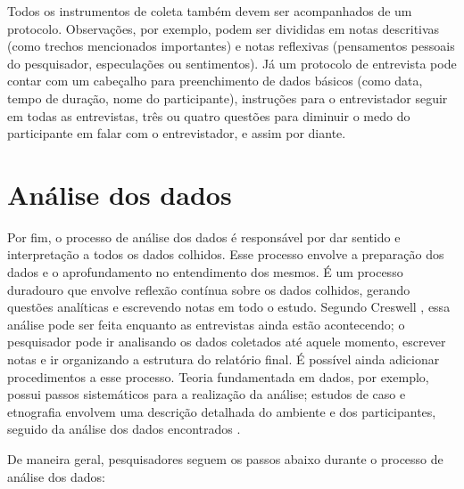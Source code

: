 Todos os instrumentos de coleta também devem ser acompanhados
de um protocolo. Observações, por exemplo, podem ser divididas em notas descritivas
(como trechos mencionados importantes) e notas reflexivas (pensamentos
pessoais do pesquisador, especulações ou sentimentos). Já um protocolo de
entrevista pode contar com um cabeçalho para preenchimento de dados básicos (como data, tempo
de duração, nome do participante), instruções para o entrevistador seguir em
todas as entrevistas, três ou quatro questões para diminuir o medo do participante em
falar com o entrevistador, e assim por diante. 

\section{Análise dos dados}

Por fim, o processo de análise dos dados é responsável por dar sentido e
interpretação a todos os dados colhidos. Esse processo envolve a preparação dos
dados e o aprofundamento no entendimento dos mesmos. É um processo duradouro que
envolve reflexão contínua sobre os dados colhidos, gerando questões analíticas e
escrevendo notas em todo o estudo. Segundo Creswell \cite{creswell}, essa
análise pode ser feita enquanto as entrevistas ainda estão acontecendo; o
pesquisador pode ir analisando os dados coletados até aquele momento,
escrever notas e ir organizando a estrutura do relatório final.
É possível ainda adicionar procedimentos a esse processo. Teoria fundamentada em
dados, por exemplo, possui passos sistemáticos para a realização da análise;
estudos de caso e etnografia envolvem uma descrição detalhada do ambiente e dos
participantes, seguido da análise dos dados encontrados \cite{stake}.

De maneira geral, pesquisadores seguem os passos abaixo durante o processo de
análise dos dados:

